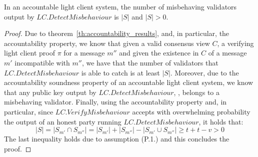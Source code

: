 \begin{corollary} In an accountable light client system, the number of misbehaving validators output by 
$\mathit{LC.DetectMisbehaviour}$ is $|S|$ and $|S| > 0$.
\end{corollary}
\begin{proof} Due to theorem~\ref{th:accountability_results}, and, in particular, the accountability property, 
we know that given a valid consensus view $C$, a verifying light client proof $\pi$ for a message $m''$ 
and given the existence in $C$ of a message $m'$ incompatible with $m''$, we have that the number of 
validators that $\mathit{LC.DetectMisbehaviour}$ is able to catch is at least $|S|$. Moreover, due 
to the accountability soundness property of an accountable light client system, we know that any public 
key output by $\mathit{LC.DetectMisbehaviour}$, \ewnp, belongs to a misbehaving validator. 
Finally, using the accountability property and, in particular, since $\mathit{LC.VerifyMisbehaviour}$ accepts 
with overwhelming probability the output of an honest party running $\mathit{LC.DetectMisbehaviour}$, it holds that:
$$ |S| = |S_{m'} \cap S_{m''}| = |S_{m'}| + |S_{m''}| - |S_{m'} \cup S_{m''}| \geq t + t - v > 0$$ 
The last inequality holds due to assumption (P.1.) and this concludes the proof.
\end{proof}
